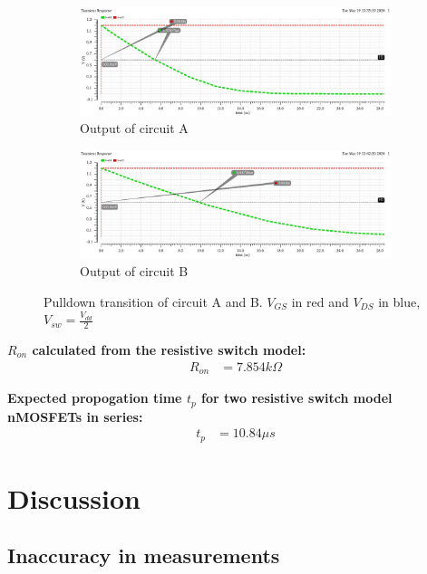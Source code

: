 \documentclass[onecolumn]{article}
\begin{document}
\begin{figure}[h!]
  \centering
  \begin{subfigure}{.75\textwidth}
    \includegraphics[width=1.1\linewidth]{task2a.jpg}
    \caption{Output of circuit A}
    \label{fig:sub7}
  \end{subfigure}
  \begin{subfigure}{.75\textwidth}
    \includegraphics[width=1.1\linewidth]{task2b.jpg}
    \caption{Output of circuit B}
    \label{fig:sub8}
  \end{subfigure}
  \caption{Pulldown transition of circuit A and B. $V_{GS}$ in red and $V_{DS}$ in blue, $V_{sw} = \frac{V_{dd}}{2}$}
  \label{fig:6}
\end{figure}

\textbf{$R_{on}$ calculated from the resistive switch model:}
\begin{align}
  R_{on} &= 7.854 k\Omega
\end{align}

\textbf{Expected propogation time $t_p$ for two resistive switch model nMOSFETs in series:}
\begin{align}
  t_p &= 10.84 \mu s
\end{align}



\section{Discussion}

\subsection{Inaccuracy in measurements}
\end{document}
